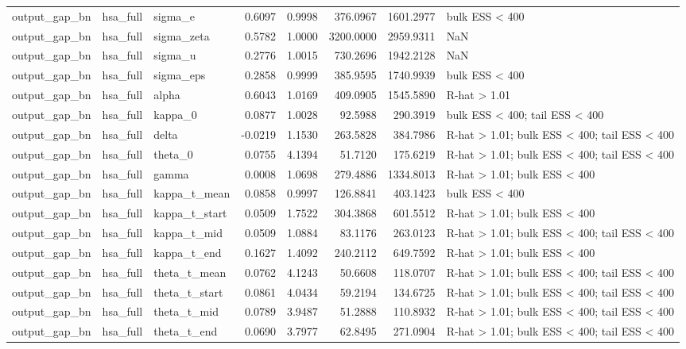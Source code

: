 \begin{tabular}{lllrrrrl}
output\_gap\_bn & hsa\_full & sigma\_e & 0.6097 & 0.9998 & 376.0967 & 1601.2977 & bulk ESS < 400 \\
output\_gap\_bn & hsa\_full & sigma\_zeta & 0.5782 & 1.0000 & 3200.0000 & 2959.9311 & NaN \\
output\_gap\_bn & hsa\_full & sigma\_u & 0.2776 & 1.0015 & 730.2696 & 1942.2128 & NaN \\
output\_gap\_bn & hsa\_full & sigma\_eps & 0.2858 & 0.9999 & 385.9595 & 1740.9939 & bulk ESS < 400 \\
output\_gap\_bn & hsa\_full & alpha & 0.6043 & 1.0169 & 409.0905 & 1545.5890 & R-hat > 1.01 \\
output\_gap\_bn & hsa\_full & kappa\_0 & 0.0877 & 1.0028 & 92.5988 & 290.3919 & bulk ESS < 400; tail ESS < 400 \\
output\_gap\_bn & hsa\_full & delta & -0.0219 & 1.1530 & 263.5828 & 384.7986 & R-hat > 1.01; bulk ESS < 400; tail ESS < 400 \\
output\_gap\_bn & hsa\_full & theta\_0 & 0.0755 & 4.1394 & 51.7120 & 175.6219 & R-hat > 1.01; bulk ESS < 400; tail ESS < 400 \\
output\_gap\_bn & hsa\_full & gamma & 0.0008 & 1.0698 & 279.4886 & 1334.8013 & R-hat > 1.01; bulk ESS < 400 \\
output\_gap\_bn & hsa\_full & kappa\_t\_mean & 0.0858 & 0.9997 & 126.8841 & 403.1423 & bulk ESS < 400 \\
output\_gap\_bn & hsa\_full & kappa\_t\_start & 0.0509 & 1.7522 & 304.3868 & 601.5512 & R-hat > 1.01; bulk ESS < 400 \\
output\_gap\_bn & hsa\_full & kappa\_t\_mid & 0.0509 & 1.0884 & 83.1176 & 263.0123 & R-hat > 1.01; bulk ESS < 400; tail ESS < 400 \\
output\_gap\_bn & hsa\_full & kappa\_t\_end & 0.1627 & 1.4092 & 240.2112 & 649.7592 & R-hat > 1.01; bulk ESS < 400 \\
output\_gap\_bn & hsa\_full & theta\_t\_mean & 0.0762 & 4.1243 & 50.6608 & 118.0707 & R-hat > 1.01; bulk ESS < 400; tail ESS < 400 \\
output\_gap\_bn & hsa\_full & theta\_t\_start & 0.0861 & 4.0434 & 59.2194 & 134.6725 & R-hat > 1.01; bulk ESS < 400; tail ESS < 400 \\
output\_gap\_bn & hsa\_full & theta\_t\_mid & 0.0789 & 3.9487 & 51.2888 & 110.8932 & R-hat > 1.01; bulk ESS < 400; tail ESS < 400 \\
output\_gap\_bn & hsa\_full & theta\_t\_end & 0.0690 & 3.7977 & 62.8495 & 271.0904 & R-hat > 1.01; bulk ESS < 400; tail ESS < 400 \\

\end{tabular}
